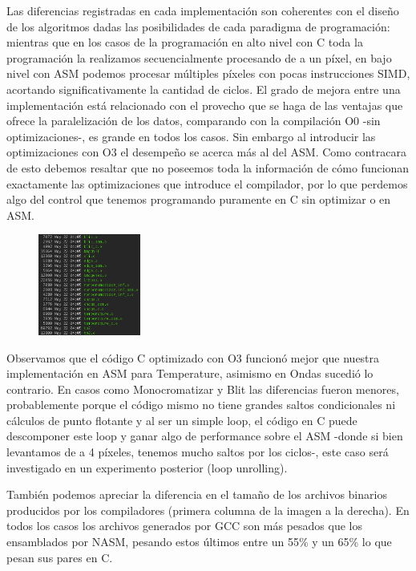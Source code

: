 Las diferencias registradas en cada implementación son coherentes con el diseño de los algoritmos dadas las posibilidades de cada paradigma de programación: mientras que en los casos de la programación en alto nivel con C toda la programación la realizamos secuencialmente procesando de a un píxel, en bajo nivel con ASM podemos procesar múltiples píxeles con pocas instrucciones SIMD, acortando significativamente la cantidad de ciclos. El grado de mejora entre una implementación está relacionado con el provecho que se haga de las ventajas que ofrece la paralelización de los datos, comparando con la compilación O0 -sin optimizaciones-, es grande en todos los casos. Sin embargo al introducir las optimizaciones con O3 el desempeño se acerca más al del ASM. Como contracara de esto debemos resaltar que no poseemos toda la información de cómo funcionan exactamente las optimizaciones que introduce el compilador, por lo que perdemos algo del control que tenemos programando puramente en C sin optimizar o en ASM.

\begin{figure}
	\centering
	\includegraphics[width=0.3\textwidth]{imagenes/testperformance/sizes.png}
\end{figure}

Observamos que el código C optimizado con O3 funcionó mejor que nuestra implementación en ASM para Temperature, asimismo en Ondas sucedió lo contrario. En casos como Monocromatizar y Blit las diferencias fueron menores, probablemente porque el código mismo no tiene grandes saltos condicionales ni cálculos de punto flotante y al ser un simple loop, el código en C puede descomponer este loop y ganar algo de performance sobre el ASM -donde si bien levantamos de a 4 píxeles, tenemos mucho saltos por los ciclos-, este caso será investigado en un experimento posterior (loop unrolling).

También podemos apreciar la diferencia en el tamaño de los archivos binarios producidos por los compiladores (primera columna de la imagen a la derecha). En todos los casos los archivos generados por GCC son más pesados que los ensamblados por NASM, pesando estos últimos entre un 55\% y un 65\% lo que pesan sus pares en C.

